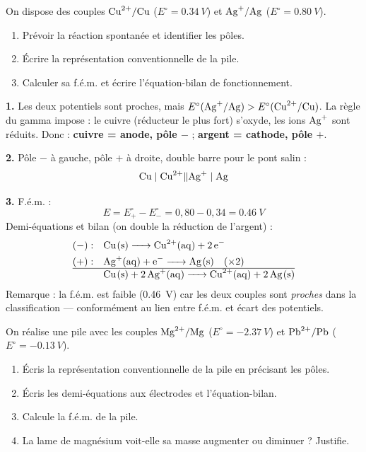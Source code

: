 \documentclass[11pt]{article}
\begin{document}
\begin{exoresolu}
On dispose des couples $\ce{Cu^{2+}}/\ce{Cu}$ ($E^\circ = \SI{+0,34}{V}$) et $\ce{Ag^{+}}/\ce{Ag}$ ($E^\circ = \SI{+0,80}{V}$).
\begin{enumerate}
\item Prévoir la réaction spontanée et identifier les pôles.
\item Écrire la représentation conventionnelle de la pile.
\item Calculer sa f.é.m. et écrire l'équation-bilan de fonctionnement.
\end{enumerate}
\tcblower
\textbf{1.} Les deux potentiels sont proches, mais $E^\circ(\ce{Ag^{+}}/\ce{Ag}) > E^\circ(\ce{Cu^{2+}}/\ce{Cu})$. La règle du gamma impose : le cuivre (réducteur le plus fort) s'oxyde, les ions $\ce{Ag^{+}}$ sont réduits. Donc : \textbf{cuivre = anode, pôle $-$} ; \textbf{argent = cathode, pôle $+$}.

\textbf{2.} Pôle $-$ à gauche, pôle $+$ à droite, double barre pour le pont salin :
\[ \ce{Cu} \mid \ce{Cu^{2+}} \Vert \ce{Ag^{+}} \mid \ce{Ag} \]

\textbf{3.} F.é.m. :
\[ E = E^\circ_{+} - E^\circ_{-} = 0{,}80 - 0{,}34 = \SI{0,46}{V} \]
Demi-équations et bilan (on double la réduction de l'argent) :
\begin{align*}
(-) : \quad & \ce{Cu(s) -> Cu^{2+}(aq) + 2e-} \\
(+) : \quad & \ce{Ag^{+}(aq) + e- -> Ag(s)} \quad (\times 2) \\
\hline
& \ce{Cu(s) + 2Ag^{+}(aq) -> Cu^{2+}(aq) + 2Ag(s)}
\end{align*}
Remarque : la f.é.m. est faible (\SI{0,46}{V}) car les deux couples sont \emph{proches} dans la classification — conformément au lien entre f.é.m. et écart des potentiels.
\end{exoresolu}

\begin{exercice}
On réalise une pile avec les couples $\ce{Mg^{2+}}/\ce{Mg}$ ($E^\circ = \SI{-2,37}{V}$) et $\ce{Pb^{2+}}/\ce{Pb}$ ($E^\circ = \SI{-0,13}{V}$).
\begin{enumerate}
\item Écris la représentation conventionnelle de la pile en précisant les pôles.
\item Écris les demi-équations aux électrodes et l'équation-bilan.
\item Calcule la f.é.m. de la pile.
\item La lame de magnésium voit-elle sa masse augmenter ou diminuer ? Justifie.
\end{enumerate}
\end{exercice}
\end{document}
